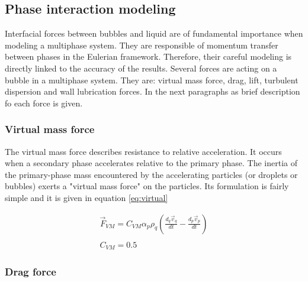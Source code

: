 \documentclass[11pt,a4paper]{article}
\begin{document}
\subsection{Phase interaction modeling}
\label{sub:forces}

Interfacial forces between bubbles and liquid are of fundamental importance when modeling a multiphase system. They are responsible of momentum transfer between phases in the Eulerian framework. Therefore, their careful modeling is directly linked to the accuracy of the results. Several forces are acting on a bubble in a multiphase system. They are:  virtual mass force, drag, lift, turbulent dispersion and wall lubrication forces. In the next paragraphs as brief description fo each force is given.


\subsubsection{Virtual mass force}
The virtual mass force describes resistance to relative acceleration. It occurs when a secondary phase accelerates relative to the primary phase. The inertia of the primary-phase mass encountered by the accelerating particles (or droplets or bubbles) exerts a "virtual mass force" on the particles. Its formulation is fairly simple and it is given in equation \ref{eq:virtual}

\begin{equation}
\begin{array}{l}
\vec{F}_{VM}=C_{VM} \alpha_{p} \rho_{q}\left(\frac{d_{q} \vec{v}_{q}}{d t}-\frac{d_{p} \vec{v}_{p}}{d t}\right)\\ \\
C_{VM}=0.5
\end{array}
\label{eq:virtual}
\end{equation}


\subsubsection{Drag force}
\end{document}

